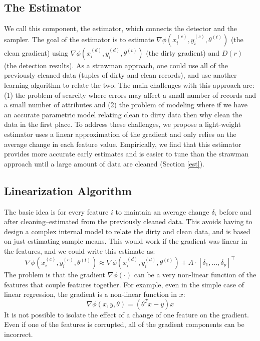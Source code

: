 \vspace{1em}

\subsection{The Estimator}\label{sampling}
We call this component, the estimator, which connects the detector and the sampler.
The goal of the estimator is to estimate $\nabla\phi(x^{(c)}_i,y^{(c)}_i,\theta^{(t)})$ (the clean gradient) using $\nabla\phi(x^{(d)}_i,y^{(d)}_i,\theta^{(t)})$ (the dirty gradient) and $D(r)$ (the detection results).
As a strawman approach, one could use all of the previously cleaned data (tuples of dirty and clean records), and use another learning algorithm to relate the two.
The main challenges with this approach are: (1) the problem of scarcity where errors may affect a small number of records and a small number of attributes and (2) the problem of modeling where if we have an accurate parametric model relating clean to dirty data then why clean the data in the first place. 
To address these challenges, we propose a light-weight estimator uses a linear approximation of the gradient and only relies on the average change in each feature value.
Empirically, we find that this estimator provides more accurate early estimates and is easier to tune than the strawman approach until a large amount of data are cleaned (Section \ref{est}).  

\vspace{1em}

\subsection{Linearization Algorithm}
The basic idea is for every feature $i$ to maintain an average change $\delta_i$ before and after cleaning--estimated from the previously cleaned data.
This avoids having to design a complex internal model to relate the dirty and clean data, and is based on just estimating sample means.
This would work if the gradient was linear in the features, and we could write this estimate as:
\[
\nabla\phi(x^{(c)}_i,y^{(c)}_i,\theta^{(t)}) \approx \nabla\phi(x^{(d)}_i,y^{(d)}_i,\theta^{(t)}) + A \cdot [\delta_1, ..., \delta_p]^{\intercal}
\]
The problem is that the gradient $\nabla\phi(\cdot)$ can be a very non-linear function of the features that couple features together.
For example, even in the simple case of linear regression, the gradient is a non-linear function in $x$:
\[
\nabla\phi(x,y,\theta) = (\theta^Tx - y)x
\]
It is not possible to isolate the effect of a change of one feature on the gradient.
Even if one of the features is corrupted, all of the gradient components can be incorrect.

